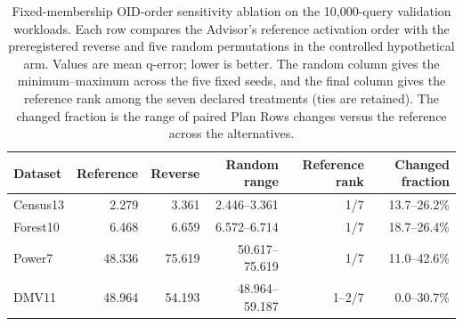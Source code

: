 \begin{table}[t]
\centering
\small
\caption{Fixed-membership OID-order sensitivity ablation on the 10,000-query
validation workloads. Each row compares the Advisor's reference activation
order with the preregistered reverse and five random permutations in the
controlled hypothetical arm. Values are mean q-error; lower is better.
The random column gives the minimum--maximum across the five fixed seeds,
and the final column gives the reference rank among the seven declared
treatments (ties are retained). The changed fraction is the range of paired
Plan Rows changes versus the reference across the alternatives.}
\label{tab:oid-order-sensitivity}
\begin{tabular}{lrrrrr}
\toprule
Dataset & Reference & Reverse & Random range & Reference rank & Changed fraction \\
\midrule
Census13 & 2.279 & 3.361 & 2.446--3.361 & 1/7 & 13.7--26.2\% \\
Forest10 & 6.468 & 6.659 & 6.572--6.714 & 1/7 & 18.7--26.4\% \\
Power7 & 48.336 & 75.619 & 50.617--75.619 & 1/7 & 11.0--42.6\% \\
DMV11 & 48.964 & 54.193 & 48.964--59.187 & 1--2/7 & 0.0--30.7\% \\
\bottomrule
\end{tabular}
\end{table}
